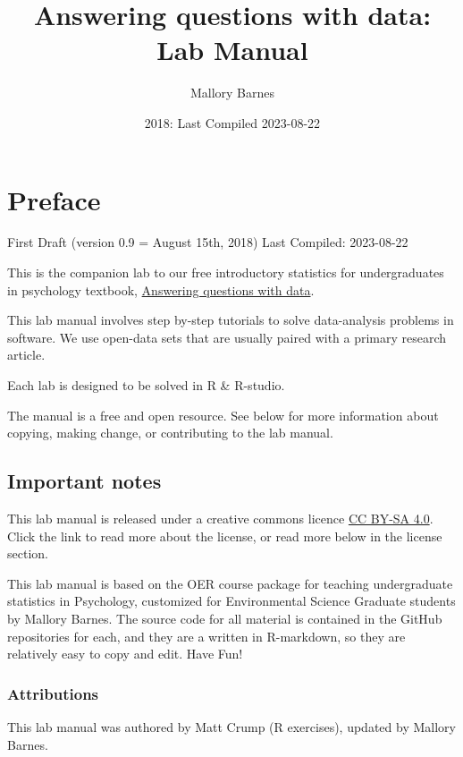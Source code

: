 \documentclass[
]{book}
\title{Answering questions with data: Lab Manual}
\author{Mallory Barnes}
\date{2018: Last Compiled 2023-08-22}
\begin{document}
\maketitle

{
\setcounter{tocdepth}{1}
\tableofcontents
}
\hypertarget{preface}{%
\chapter*{Preface}\label{preface}}

First Draft (version 0.9 = August 15th, 2018) Last Compiled: 2023-08-22

This is the companion lab to our free introductory statistics for undergraduates in psychology textbook, \href{https://crumplab.github.io/statistics/}{Answering questions with data}.

This lab manual involves step by-step tutorials to solve data-analysis problems in software. We use open-data sets that are usually paired with a primary research article.

Each lab is designed to be solved in R \& R-studio.

The manual is a free and open resource. See below for more information about copying, making change, or contributing to the lab manual.

\hypertarget{important-notes}{%
\section{Important notes}\label{important-notes}}

This lab manual is released under a creative commons licence \href{https://creativecommons.org/licenses/by-sa/4.0/}{CC BY-SA 4.0}. Click the link to read more about the license, or read more below in the license section.

This lab manual is based on the OER course package for teaching undergraduate statistics in Psychology, customized for Environmental Science Graduate students by Mallory Barnes. The source code for all material is contained in the GitHub repositories for each, and they are a written in R-markdown, so they are relatively easy to copy and edit. Have Fun!

\hypertarget{attributions}{%
\subsection{Attributions}\label{attributions}}

This lab manual was authored by Matt Crump (R exercises), updated by Mallory Barnes.
\end{document}
